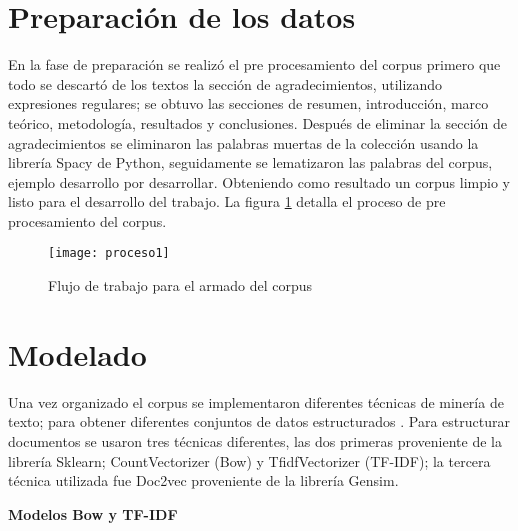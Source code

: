 \section{Preparación de los datos}
En la fase de preparación se realizó el pre procesamiento del corpus primero que todo se descartó de los textos la sección de agradecimientos,
 utilizando expresiones regulares; se obtuvo las secciones de resumen, introducción, marco teórico, metodología, resultados y conclusiones.
 Después de eliminar la sección de agradecimientos se eliminaron las palabras muertas de la colección usando la librería Spacy de Python,
 seguidamente se lematizaron las palabras del corpus, ejemplo desarrollo por desarrollar.  Obteniendo como resultado un corpus limpio y listo para el desarrollo del trabajo. La figura  \ref{fig:proceso1} detalla el proceso de pre procesamiento del corpus.

\begin{figure}[H]
\texttt{[image: proceso1]}
\caption{Flujo de trabajo para el armado del corpus}
\label{fig:proceso1}
\end{figure}



\section{Modelado}

Una vez organizado el corpus se implementaron diferentes técnicas de minería de texto; para obtener diferentes conjuntos de datos estructurados .
Para estructurar documentos se usaron tres técnicas diferentes, las dos primeras proveniente de la librería Sklearn; CountVectorizer (Bow) y TfidfVectorizer (TF-IDF); la tercera técnica utilizada fue Doc2vec proveniente de la librería Gensim. 


\textbf{Modelos Bow y TF-IDF}

